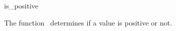 \begin{ccRefFunction}{is_positive}

\ccDefinition

The function \ccRefName\ determines if a value is positive or not.


{}

\end{ccRefFunction}
